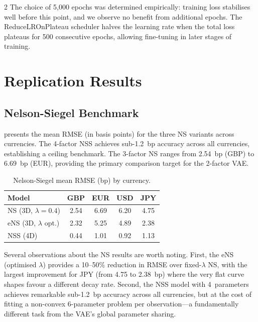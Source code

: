 \documentclass[10pt,a4paper]{article}
\theoremstyle{plain}
\theoremstyle{definition}
\begin{document}
\begin{multicols}{2}
The choice of 5{,}000 epochs was determined empirically: training loss stabilises well before this point, and we observe no benefit from additional epochs. The ReduceLROnPlateau scheduler halves the learning rate when the total loss plateaus for 500 consecutive epochs, allowing fine-tuning in later stages of training.

\section{Replication Results}\label{sec:results}

\subsection{Nelson-Siegel Benchmark}

 presents the mean RMSE (in basis points) for the three NS variants across currencies. The 4-factor NSS achieves sub-1.2~bp accuracy across all currencies, establishing a ceiling benchmark. The 3-factor NS ranges from 2.54~bp (GBP) to 6.69~bp (EUR), providing the primary comparison target for the 2-factor VAE.

\begin{table}[H]
\centering
\caption{Nelson-Siegel mean RMSE (bp) by currency.}\label{tab:ns_rmse}
\begin{tabular}{lcccc}
\toprule
Model & GBP & EUR & USD & JPY \\
\midrule
NS (3D, $\lambda{=}0.4$) & 2.54 & 6.69 & 6.20 & 4.75 \\
eNS (3D, $\lambda$ opt.) & 2.32 & 5.25 & 4.89 & 2.38 \\
NSS (4D) & 0.44 & 1.01 & 0.92 & 1.13 \\
\bottomrule
\end{tabular}
\end{table}

Several observations about the NS results are worth noting. First, the eNS (optimised $\lambda$) provides a 10--50\% reduction in RMSE over fixed-$\lambda$ NS, with the largest improvement for JPY (from 4.75 to 2.38~bp) where the very flat curve shapes favour a different decay rate. Second, the NSS model with 4~parameters achieves remarkable sub-1.2~bp accuracy across all currencies, but at the cost of fitting a non-convex 6-parameter problem per observation---a fundamentally different task from the VAE's global parameter sharing.


\end{multicols}
\end{document}
